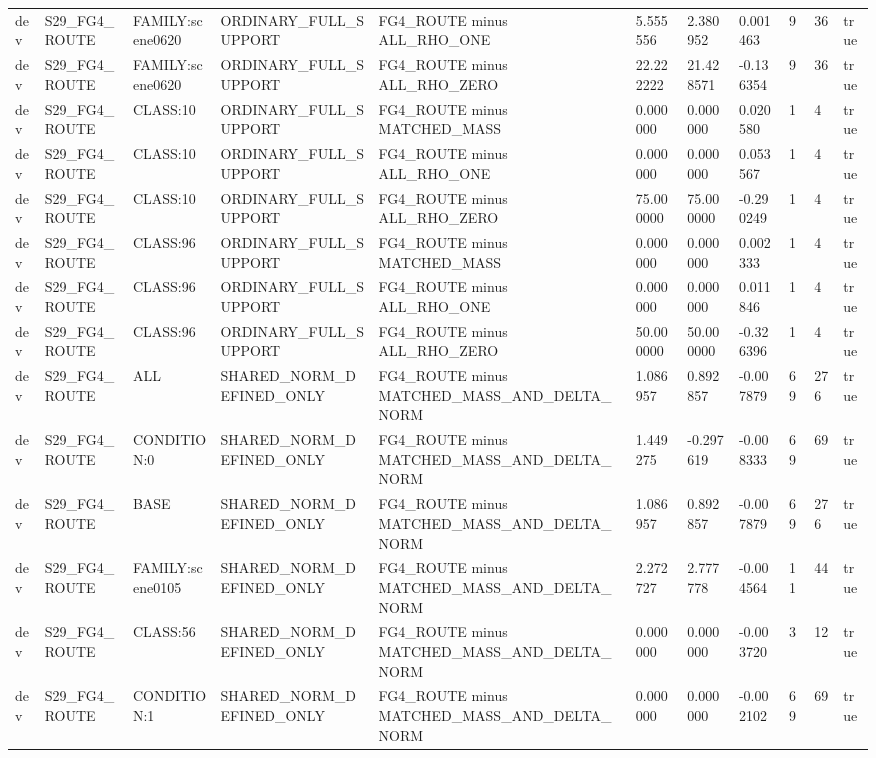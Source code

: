 \begin{tabular}{lllllllllll}
dev & S29\_FG4\_ROUTE & FAMILY:scene0620 & ORDINARY\_FULL\_SUPPORT & FG4\_ROUTE minus ALL\_RHO\_ONE & 5.555556 & 2.380952 & 0.001463 & 9 & 36 & true \\
dev & S29\_FG4\_ROUTE & FAMILY:scene0620 & ORDINARY\_FULL\_SUPPORT & FG4\_ROUTE minus ALL\_RHO\_ZERO & 22.222222 & 21.428571 & -0.136354 & 9 & 36 & true \\
dev & S29\_FG4\_ROUTE & CLASS:10 & ORDINARY\_FULL\_SUPPORT & FG4\_ROUTE minus MATCHED\_MASS & 0.000000 & 0.000000 & 0.020580 & 1 & 4 & true \\
dev & S29\_FG4\_ROUTE & CLASS:10 & ORDINARY\_FULL\_SUPPORT & FG4\_ROUTE minus ALL\_RHO\_ONE & 0.000000 & 0.000000 & 0.053567 & 1 & 4 & true \\
dev & S29\_FG4\_ROUTE & CLASS:10 & ORDINARY\_FULL\_SUPPORT & FG4\_ROUTE minus ALL\_RHO\_ZERO & 75.000000 & 75.000000 & -0.290249 & 1 & 4 & true \\
dev & S29\_FG4\_ROUTE & CLASS:96 & ORDINARY\_FULL\_SUPPORT & FG4\_ROUTE minus MATCHED\_MASS & 0.000000 & 0.000000 & 0.002333 & 1 & 4 & true \\
dev & S29\_FG4\_ROUTE & CLASS:96 & ORDINARY\_FULL\_SUPPORT & FG4\_ROUTE minus ALL\_RHO\_ONE & 0.000000 & 0.000000 & 0.011846 & 1 & 4 & true \\
dev & S29\_FG4\_ROUTE & CLASS:96 & ORDINARY\_FULL\_SUPPORT & FG4\_ROUTE minus ALL\_RHO\_ZERO & 50.000000 & 50.000000 & -0.326396 & 1 & 4 & true \\
dev & S29\_FG4\_ROUTE & ALL & SHARED\_NORM\_DEFINED\_ONLY & FG4\_ROUTE minus MATCHED\_MASS\_AND\_DELTA\_NORM & 1.086957 & 0.892857 & -0.007879 & 69 & 276 & true \\
dev & S29\_FG4\_ROUTE & CONDITION:0 & SHARED\_NORM\_DEFINED\_ONLY & FG4\_ROUTE minus MATCHED\_MASS\_AND\_DELTA\_NORM & 1.449275 & -0.297619 & -0.008333 & 69 & 69 & true \\
dev & S29\_FG4\_ROUTE & BASE & SHARED\_NORM\_DEFINED\_ONLY & FG4\_ROUTE minus MATCHED\_MASS\_AND\_DELTA\_NORM & 1.086957 & 0.892857 & -0.007879 & 69 & 276 & true \\
dev & S29\_FG4\_ROUTE & FAMILY:scene0105 & SHARED\_NORM\_DEFINED\_ONLY & FG4\_ROUTE minus MATCHED\_MASS\_AND\_DELTA\_NORM & 2.272727 & 2.777778 & -0.004564 & 11 & 44 & true \\
dev & S29\_FG4\_ROUTE & CLASS:56 & SHARED\_NORM\_DEFINED\_ONLY & FG4\_ROUTE minus MATCHED\_MASS\_AND\_DELTA\_NORM & 0.000000 & 0.000000 & -0.003720 & 3 & 12 & true \\
dev & S29\_FG4\_ROUTE & CONDITION:1 & SHARED\_NORM\_DEFINED\_ONLY & FG4\_ROUTE minus MATCHED\_MASS\_AND\_DELTA\_NORM & 0.000000 & 0.000000 & -0.002102 & 69 & 69 & true \\

\end{tabular}
